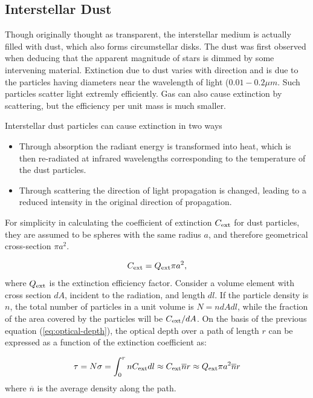 \newpage
\subsection{Interstellar Dust}

Though originally thought as transparent, the interstellar medium is actually filled with dust, which also forms circumstellar disks. The dust was first observed when deducing that the apparent magnitude of stars is dimmed by some intervening material. Extinction due to dust varies with direction and is due to the particles having diameters near the wavelength of light ($0.01 - 0.2 \mu m$. Such particles scatter light extremly efficiently. Gas can also cause extinction by scattering, but the efficiency per unit mass is much smaller. 

Interstellar dust particles can cause extinction in two ways \citep{Karttunen2017}
\begin{itemize}
\item Through absorption the radiant energy is transformed into heat, which is then re-radiated at infrared wavelengths corresponding to the temperature of the dust particles.
\item Through scattering the direction of light propagation is changed, leading to a reduced intensity in the original direction of propagation.
\end{itemize}

For simplicity in calculating the coefficient of extinction $C_{\rm{ext}}$ for dust particles, they are assumed to be spheres with the same radius $a$, and therefore geometrical cross-section $\pi a^2$.

\begin{equation}\label{eq:coeff-ext}
	C_{\rm{ext}} = Q_{\rm{ext}} \pi a^2,
\end{equation}
%
where $Q_{\rm{ext}}$ is the extinction efficiency factor. Consider a volume element with cross section $dA$, incident to the radiation, and length $dl$. If the particle density is $n$, the total number of particles in a unit volume is $N= n dA dl$, while the fraction of the area covered by the particles will be $C_{\rm{ext}}/dA$. On the basis of the previous equation (\ref{eq:optical-depth}), the optical depth over a path of length $r$ can be expressed as a function of the extinction coefficient as: 

\begin{equation}
	\tau = N \sigma = \int_0^r n C_{\rm{ext}} dl \approx C_{\rm{ext}} \overline{n} r \approx Q_{\rm{ext}} \pi a^2 \overline{n} r
\end{equation}
%
where $\overline{n}$ is the average density along the path.

